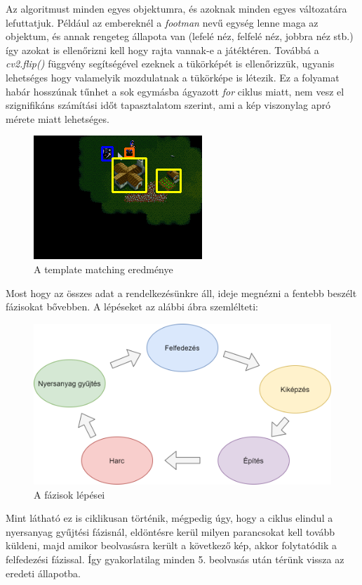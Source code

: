 Az algoritmust minden egyes objektumra, és azoknak minden egyes változatára lefuttatjuk. Például az embereknél a \textit{footman} nevű egység lenne maga az objektum, és annak rengeteg állapota van (lefelé néz, felfelé néz, jobbra néz stb.) így azokat is ellenőrizni kell hogy rajta vannak-e a játéktéren. Továbbá a \textit{cv2.flip()} függvény
segítségével ezeknek a tükörképét is ellenőrizzük, ugyanis lehetséges hogy valamelyik mozdulatnak a tükörképe is létezik. Ez a folyamat habár hosszúnak tűnhet a sok egymásba ágyazott \textit{for} ciklus miatt, nem vesz el szignifikáns számítási időt tapasztalatom szerint, ami a kép viszonylag apró mérete miatt lehetséges. 

\begin{figure}[h]
    \centering
    \includegraphics[scale=1]{images/res.png}
    \caption{A template matching eredménye}
    \label{fig:rect}
\end{figure}
\pagebreak
Most hogy az összes adat a rendelkezésünkre áll, ideje megnézni a fentebb beszélt fázisokat bővebben.
A lépéseket az alábbi ábra szemlélteti:
\begin{figure}[h]
    \centering
    \includegraphics[scale=0.4]{images/phases.png}
    \caption{A fázisok lépései}
    \label{fig:phases}
\end{figure}

Mint látható ez is ciklikusan történik, mégpedig úgy, hogy a ciklus elindul a nyersanyag gyűjtési fázisnál, eldöntésre kerül milyen parancsokat kell tovább küldeni, majd amikor beolvasásra került a következő kép, akkor folytatódik a felfedezési fázissal. Így gyakorlatilag minden 5. beolvasás után térünk vissza az eredeti állapotba.

